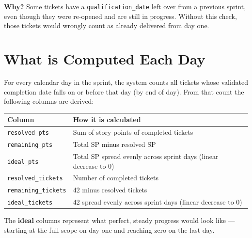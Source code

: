 \documentclass[12pt, a4paper]{article}
\begin{document}
\textbf{Why?} Some tickets have a \texttt{qualification\_date} left over
from a previous sprint, even though they were re-opened and are still in
progress. Without this check, those tickets would wrongly count as already
delivered from day one.

\section{What is Computed Each Day}

For every calendar day in the sprint, the system counts all tickets whose
validated completion date falls on or before that day (by end of day).
From that count the following columns are derived:

\medskip
\begin{center}
\begin{tabular}{ll}
\toprule
\textbf{Column} & \textbf{How it is calculated} \\
\midrule
\texttt{resolved\_pts}           & Sum of story points of completed tickets \\
\texttt{remaining\_pts}          & Total SP minus resolved SP \\
\texttt{ideal\_pts}              & Total SP spread evenly across sprint days (linear decrease to 0) \\
\texttt{resolved\_tickets}       & Number of completed tickets \\
\texttt{remaining\_tickets}      & 42 minus resolved tickets \\
\texttt{ideal\_tickets}          & 42 spread evenly across sprint days (linear decrease to 0) \\
\bottomrule
\end{tabular}
\end{center}

\medskip
The \textbf{ideal} columns represent what perfect, steady progress would look
like --- starting at the full scope on day one and reaching zero on the last day.
\end{document}
